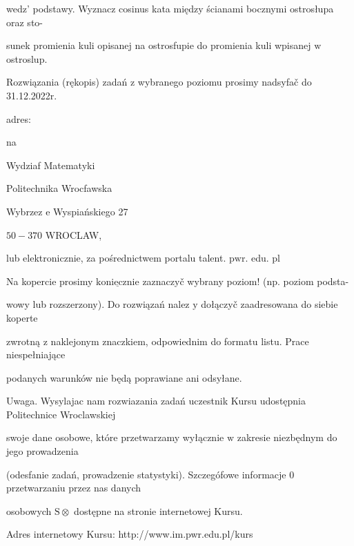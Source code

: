 \documentclass[a4paper,12pt]{article}
\begin{document}
wedz' podstawy. Wyznacz cosinus kata między ścianami bocznymi ostrosłupa oraz sto-

sunek promienia kuli opisanej na ostrosfupie do promienia kuli wpisanej $\mathrm{w}$ ostroslup.

Rozwiązania (rękopis) zadań z wybranego poziomu prosimy nadsyfač do 31.12.2022r.

adres:

na

Wydziaf Matematyki

Politechnika Wrocfawska

Wybrzez $\mathrm{e}$ Wyspiańskiego 27

$50-370$ WROCLAW,

lub elektronicznie, za pośrednictwem portalu talent. $\mathrm{p}\mathrm{w}\mathrm{r}$. edu. pl

Na kopercie prosimy $\underline{\mathrm{k}\mathrm{o}\mathrm{n}\mathrm{i}\mathrm{e}\mathrm{c}\mathrm{z}\mathrm{n}\mathrm{i}\mathrm{e}}$ zaznaczyč wybrany poziom! (np. poziom podsta-

wowy lub rozszerzony). Do rozwiązań nalez $\mathrm{y}$ dołączyč zaadresowana do siebie koperte

zwrotną $\mathrm{z}$ naklejonym znaczkiem, odpowiednim do formatu listu. Prace niespełniające

podanych warunków nie będą poprawiane ani odsyłane.

Uwaga. Wysylajac nam rozwiazania zadań uczestnik Kursu udostępnia Politechnice Wroclawskiej

swoje dane osobowe, które przetwarzamy wyłącznie $\mathrm{w}$ zakresie niezbędnym do jego prowadzenia

(odesfanie zadań, prowadzenie statystyki). Szczegófowe informacje $0$ przetwarzaniu przez nas danych

osobowych $\mathrm{S}\otimes$ dostępne na stronie internetowej Kursu.

Adres internetowy Kursu: http://www.im.pwr.edu.pl/kurs
\end{document}
